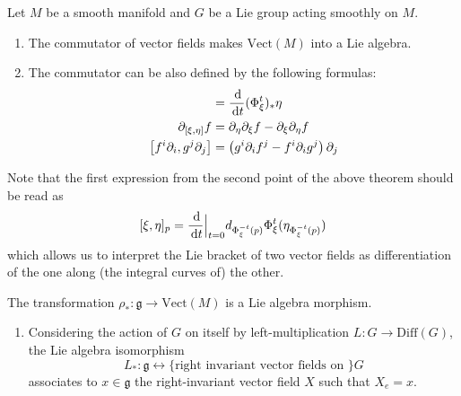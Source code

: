 \documentclass{report}
\begin{document}
\begin{proposition}
    Let $M$ be a smooth manifold and $G$ be a Lie group acting smoothly on $M$.
    \begin{enumerate}[label = (\roman*)]
        \item The commutator of vector fields makes $\mathrm{Vect}(M)$ into a Lie algebra.
        \item The commutator can be also defined by the following formulas:
        \begin{align*}
            [\xi, \eta] &= \frac{\d}{\d t} (\Phi^t_\xi)_* \eta \\
            \partial_{[\xi, \eta]}f &= \partial_\eta \partial_\xi f - \partial_\xi \partial_\eta f\\
            \left[ f^i \partial_i, g^j \partial_j \right] &= \left( g^i \partial_i f^j - f^i \partial_i g^j \right) \partial_j
        \end{align*}
    \end{enumerate}
\end{proposition}
Note that the first expression from the second point of the above theorem should be read as
\[
[\xi, \eta]_p = \frac{\,\mathrm{d}}{\,\mathrm{d} t}\Big|_{t=0} d_{\Phi^{-t}_\xi(p)} \Phi^t_\xi (\eta_{\Phi^{-t}_\xi(p)})
\]
which allows us to interpret the Lie bracket of two vector fields as differentiation of the one along (the integral curves of) the other.

\begin{theorem}
    The transformation $\rho_*: \mathfrak g \to \mathrm{Vect}(M)$ is a Lie algebra morphism.
\end{theorem}

\begin{example}
    \begin{enumerate}[label = (\roman*)]
        \item Considering the action of $G$ on itself by left-multiplication $L: G \to \mathrm{Diff}(G)$, the Lie algebra isomorphism
        \[
        L_*: \mathfrak g \leftrightarrow \{\text{right invariant vector fields on } \} G
        \]
        associates to $x \in \mathfrak g$ the right-invariant vector field $X$ such that $X_e = x$.
    \end{enumerate}
\end{example}
\end{document}
